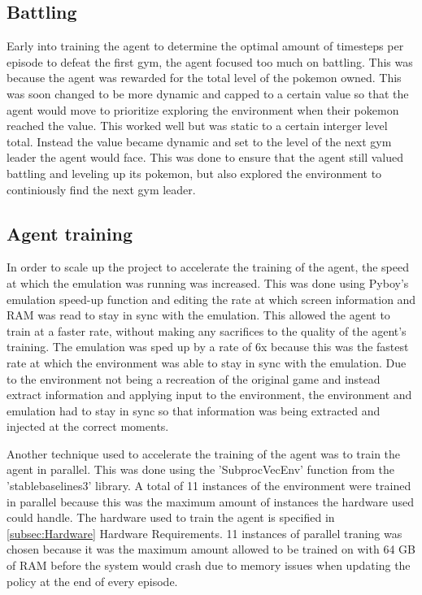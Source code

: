 \subsection{Battling}

Early into training the agent to determine the optimal amount of timesteps per episode to defeat the first gym, the agent focused too much on battling. This was because the agent was rewarded for the total level of the pokemon owned. This was soon changed to be more dynamic and capped to a certain value so that the agent would move to prioritize exploring the environment when their pokemon reached the value. This worked well but was static to a certain interger level  total. Instead the value became dynamic and set to the level of the next gym leader the agent would face. This was done to ensure that the agent still valued battling and leveling up its pokemon, but also explored the environment to continiously find the next gym leader. 


\subsection{Agent training}

In order to scale up the project to accelerate the training of the agent, the speed at which the emulation was running was increased. This was done using Pyboy's emulation speed-up function and editing the rate at which screen information and RAM was read to stay in sync with the emulation. This allowed the agent to train at a faster rate, without making any sacrifices to the quality of the agent's training. The emulation was sped up by a rate of 6x because this was the fastest rate at which the environment was able to stay in sync with the emulation. Due to the environment not being a recreation of the original game and instead extract information and applying input to the environment, the environment and emulation had to stay in sync so that information was being extracted and injected at the correct moments.

Another technique used to accelerate the training of the agent was to train the agent in parallel. This was done using the 'SubprocVecEnv' function from the 'stablebaselines3' library. A total of 11 instances of the environment were trained in parallel because this was the maximum amount of instances the hardware used could handle. The hardware used to train the agent is specified in \ref{subsec:Hardware} Hardware Requirements. 11 instances of parallel traning was chosen because it was the maximum amount allowed to be trained on with 64 GB of RAM before the system would crash due to memory issues when updating the policy at the end of every episode. 

